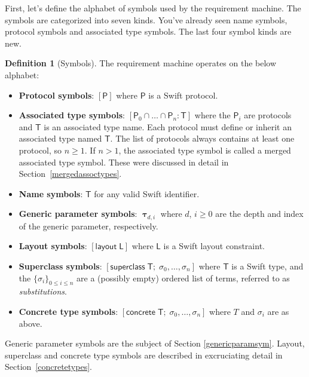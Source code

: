 \documentclass[headsepline,bibliography=totoc]{scrreport}
\newcommand{\namesym}[1]{\mathsf{#1}}
\newcommand{\proto}[1]{\bm{\mathsf{#1}}}
\newcommand{\protosym}[1]{[\proto{#1}]}
\newcommand{\genericsym}[2]{\bm{\uptau}_{#1,#2}}
\newcommand{\layoutsym}[1]{[\mathsf{layout\;#1}]}
\newcommand{\supersym}[1]{[\mathsf{superclass}\;#1]}
\newcommand{\concretesym}[1]{[\mathsf{concrete}\;#1]}
\theoremstyle{definition}
\theoremstyle{definition}
\newtheorem{definition}{Definition}[chapter]
\theoremstyle{definition}
\begin{document}
First, let's define the alphabet of symbols used by the requirement machine. The symbols are categorized into seven kinds. You've already seen name symbols, protocol symbols and associated type symbols. The last four symbol kinds are new.

\begin{definition}[Symbols]\label{symboldef}
The requirement machine operates on the below alphabet:
\begin{itemize}
\item \textbf{Protocol symbols}: $\protosym{P}$ where $\proto{P}$ is a Swift protocol.
\item \textbf{Associated type symbols}: $[\proto{P}_0\cap\ldots\cap\proto{P}_n\colon\namesym{T}]$ where the $\proto{P}_i$ are protocols and $\namesym{T}$ is an associated type name. Each protocol must define or inherit an associated type named $\namesym{T}$. The list of protocols always contains at least one protocol, so $n\geq 1$. If $n > 1$, the associated type symbol is called a merged associated type symbol. These were discussed in detail in Section~\ref{mergedassoctypes}.
\item \textbf{Name symbols}: $\namesym{T}$ for any valid Swift identifier.
\item \textbf{Generic parameter symbols}: $\genericsym{d}{i}$ where $d$, $i\geq 0$ are the depth and index of the generic parameter, respectively.
\item \textbf{Layout symbols}: $\layoutsym{L}$ where $\namesym{L}$ is a Swift layout constraint.
\item \textbf{Superclass symbols}: $\supersym{\namesym{T};\;\sigma_0,\ldots,\sigma_n}$ where $\namesym{T}$ is a Swift type, and the $\{\sigma_i\}_{0\le i \le n}$ are a (possibly empty) ordered list of terms, referred to as \emph{substitutions}.
\item {} \textbf{Concrete type symbols}: $\concretesym{\namesym{T};\;\sigma_0,\ldots,\sigma_n}$ where $T$ and $\sigma_i$ are as above.
\end{itemize}
\end{definition}

Generic parameter symbols are the subject of Section \ref{genericparamsym}. Layout, superclass and concrete type symbols are described in excruciating detail in Section~\ref{concretetypes}.
\end{document}
